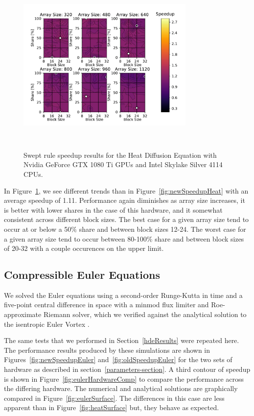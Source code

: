 \documentclass[preprints,article,accept,moreauthors,pdftex]{Definitions/mdpi}
\def\oldCPU{Intel Skylake Silver 4114} %
\def\oldGPU{Nvidia GeForce GTX 1080 Ti}
\begin{document}
\begin{figure}[H]
    
    \begin{center}
        \includegraphics[height=9cm,width=0.78\textwidth, trim={0.75cm 0.4cm 0.8cm 0.7cm},clip]{figs/speedUpheatOld.pdf}
        \caption{Swept rule speedup results for the Heat Diffusion Equation with \oldGPU{} GPUs and \oldCPU{} CPUs.}
        \label{fig:oldSpeedupHeat} 
    \end{center}
\end{figure}


In Figure~\ref{fig:oldSpeedupHeat}, we see different trends than in Figure~\ref{fig:newSpeedupHeat} with an average speedup of 1.11. Performance again diminishes as array size increases, it is better with lower shares in the case of this hardware, and it somewhat consistent across different block sizes. The best case for a given array size tend to occur at or below a 50\% share and between block sizes 12-24. The worst case for a given array size tend to occur between 80-100\% share and between block sizes of 20-32 with a couple occurences on the upper limit.

\subsection{Compressible Euler Equations}
\label{eulerVortexResults}
We solved the Euler equations using a second-order Runge-Kutta in time and a five-point central difference in space with a minmod flux limiter and Roe-approximate Riemann solver, which we verified against the analytical solution to the isentropic Euler Vortex \cite{SpiegelAMethods}.

The same tests that we performed in Section~\ref{hdeResults} were repeated here. The performance results produced by these simulations are shown in Figures~\ref{fig:newSpeedupEuler} and~\ref{fig:oldSpeedupEuler} for the two sets of hardware as described in section~\ref{parameters-section}. A third contour of speedup is shown in Figure~\ref{fig:eulerHardwareComp} to compare the performance across the differing hardware. The numerical and analytical solutions are graphically compared in Figure~\ref{fig:eulerSurface}. The differences in this case are less apparent than in Figure~\ref{fig:heatSurface} but, they behave as expected. 
\end{document}
